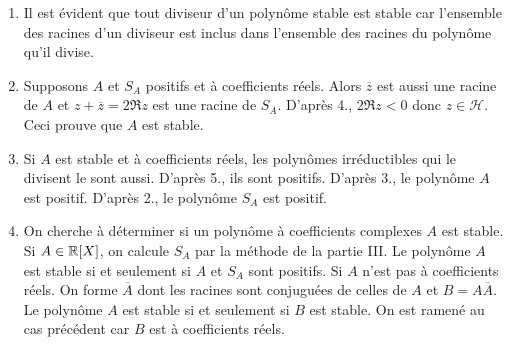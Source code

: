 \begin{enumerate}
\item Il est évident que tout diviseur d'un polynôme stable est stable car l'ensemble des racines d'un diviseur est inclus dans l'ensemble des racines du polynôme qu'il divise.
\item Supposons $A$ et $S_A$ positifs et à coefficients réels. Alors $\overline{z}$ est aussi une racine de $A$ et $z+\overline{z}=2\Re z$ est une racine de $S_A$. D'après 4., $2\Re z <0$ donc $z\in \mathcal H$. Ceci prouve que $A$ est stable.
\item Si $A$ est stable et à coefficients réels, les polynômes irréductibles qui le divisent le sont aussi. D'après 5., ils sont positifs. D'après 3., le polynôme $A$ est positif. D'après 2., le polynôme $S_A$ est positif.
\item On  cherche à déterminer si un polynôme à coefficients complexes $A$ est stable.\newline
Si $A\in\mathbb{R}[X]$, on calcule $S_A$ par la méthode de la partie III. Le polynôme $A$ est stable si et seulement si $A$ et $S_A$ sont positifs.\newline
Si $A$ n'est pas à coefficients réels. On forme $\overline{A}$ dont les racines sont conjuguées de celles de $A$ et $B=A\overline{A}$. Le polynôme $A$ est stable si et seulement si $B$ est stable. On est ramené au cas précédent car $B$ est à coefficients réels.
\end{enumerate}

 